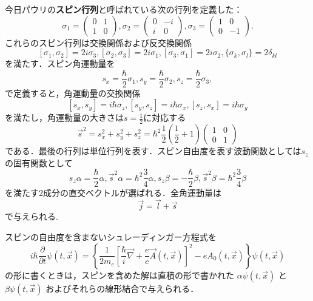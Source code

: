 \documentclass{jsarticle}
\begin{document}
今日パウリの\textbf{スピン行列}と呼ばれている次の行列を定義した：
\begin{equation}
    \sigma_1 = \begin{pmatrix}
        0 & 1 \\
        1 & 0
    \end{pmatrix},
    \sigma_2 = \begin{pmatrix}
        0 & -i \\
        i & 0
    \end{pmatrix},
    \sigma_3 = \begin{pmatrix}
        1 & 0 \\
        0 & -1
    \end{pmatrix}.
    \label{eq:pauliMatrices}  %
\end{equation}
これらのスピン行列は交換関係および反交換関係
\[
[\sigma_1,\sigma_2] =2i\sigma_3,
[\sigma_2,\sigma_3] =2i\sigma_1,
[\sigma_3,\sigma_1] =2i\sigma_2,
\{ \sigma_k,\sigma_l \} = 2\delta_{kl}
\]
を満たす．スピン角運動量を
\[
s_x = \frac{\hbar}{2} \sigma_1,
s_y = \frac{\hbar}{2} \sigma_2,
s_z = \frac{\hbar}{2} \sigma_3,
\]
で定義すると，角運動量の交換関係
\[
[s_x,s_y] = i\hbar\sigma_z,
[s_y,s_z] = i\hbar\sigma_x,
[s_z,s_x] = i\hbar\sigma_y
\]
を満たし，角運動量の大きさは$s=\frac{1}{2}$に対応する
\[
\vec{s}^2 = s_x^2 + s_y^2 + s_z^2 = \hbar^2\frac{1}{2}(\frac{1}{2}+1) 
    \begin{pmatrix}
    1 & 0 \\
    0 & 1    
    \end{pmatrix}
\]
である．最後の行列は単位行列を表す．スピン自由度を表す波動関数としては$s_z$の固有関数として
\[
s_z\alpha = \frac{\hbar}{2}\alpha,\vec{s}^2\alpha = \hbar^2\frac{3}{4}\alpha,
s_z\beta = -\frac{\hbar}{2}\beta,\vec{s}^2\beta = \hbar^2\frac{3}{4}\beta
\]
を満たす2成分の直交ベクトルが選ばれる．全角運動量は
\[
\vec{j} = \vec{l} + \vec{s}
\]
で与えられる.

スピンの自由度を含まないシュレーディンガー方程式を
\[
i\hbar\frac{\partial}{\partial t}\psi(t,\vec{x}) =
\left\{
\frac{1}{2m_e} \left[ \frac{\hbar}{i}\vec{\nabla} + \frac{e}{c}\vec{A}(t,\vec{x}) \right]^2 - e A_0(t,\vec{x})
\right\}\psi(t,\vec{x})
\]
の形に書くときは，スピンを含めた解は直積の形で書かれた
$\alpha\psi(t,\vec{x})$
と
$\beta\psi(t,\vec{x})$
およびそれらの線形結合で与えられる．
\end{document}
